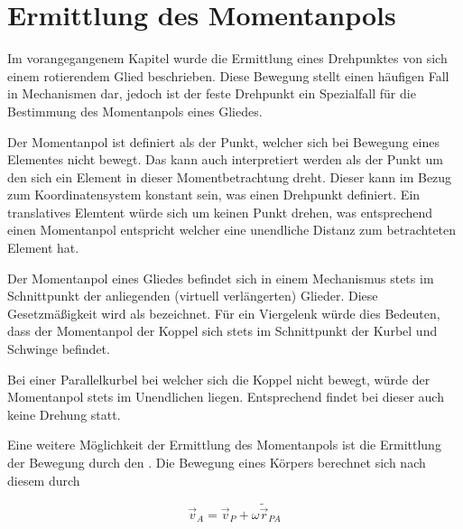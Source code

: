 
\chapter{Ermittlung des Momentanpols}\label{ch:ermittlung_momentanpol}


Im vorangegangenem Kapitel wurde die Ermittlung eines Drehpunktes von sich einem rotierendem Glied beschrieben.
Diese Bewegung stellt einen häufigen Fall in Mechanismen dar, jedoch ist der feste Drehpunkt ein Spezialfall für die Bestimmung des Momentanpols eines Gliedes.

Der Momentanpol ist definiert als der Punkt, welcher sich bei Bewegung eines Elementes nicht bewegt.
Das kann auch interpretiert werden als der Punkt um den sich ein Element in dieser Momentbetrachtung dreht.
Dieser kann im Bezug zum Koordinatensystem konstant sein, was einen Drehpunkt definiert.
Ein translatives Elemtent würde sich um keinen Punkt drehen, was entsprechend einen Momentanpol entspricht welcher eine unendliche Distanz zum betrachteten Element hat.


Der Momentanpol eines Gliedes befindet sich in einem Mechanismus stets im Schnittpunkt der anliegenden (virtuell verlängerten) Glieder.
Diese Gesetzmäßigkeit wird als  %
bezeichnet.
Für ein Viergelenk würde dies Bedeuten, dass der Momentanpol der Koppel sich stets im Schnittpunkt der Kurbel und Schwinge befindet.

Bei einer Parallelkurbel bei welcher sich die Koppel nicht bewegt, würde der Momentanpol stets im Unendlichen liegen.
Entsprechend findet bei dieser auch keine Drehung statt.

Eine weitere Möglichkeit der Ermittlung des Momentanpols ist die Ermittlung der Bewegung durch den . %
Die Bewegung eines Körpers berechnet sich nach diesem durch

\begin{equation}
    \vec{v}_A = \vec{v}_P + \omega \tilde{\vec{r}}_{PA}
    \label{eq:satz_von_euler}
\end{equation} 

